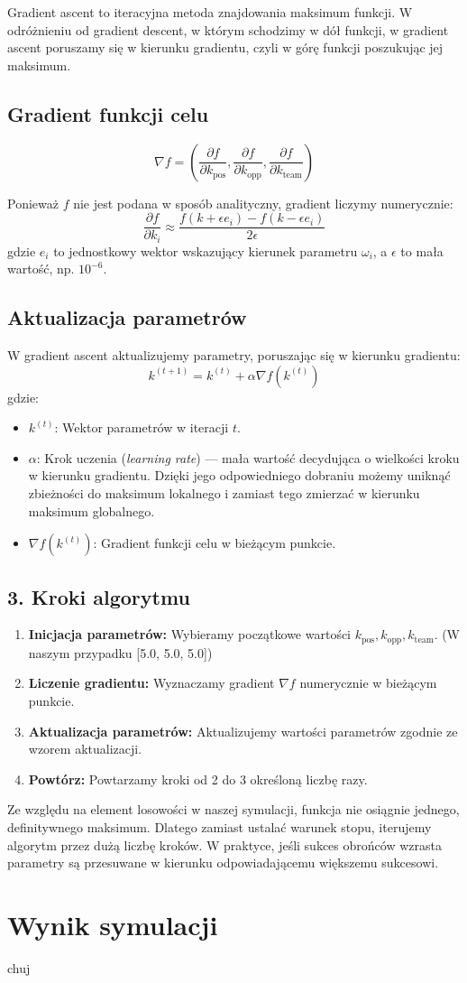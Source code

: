 \documentclass{article}
\begin{document}
Gradient ascent to iteracyjna metoda znajdowania maksimum funkcji. W odróżnieniu od gradient descent, w którym schodzimy w dół funkcji, w gradient ascent poruszamy się w kierunku gradientu, czyli w górę funkcji poszukując jej maksimum.

\subsection*{Gradient funkcji celu}

\[
\nabla f = \left( \frac{\partial f}{\partial k_{\text{pos}}}, \frac{\partial f}{\partial k_{\text{opp}}}, \frac{\partial f}{\partial k_{\text{team}}} \right)
\]

Ponieważ \(f\) nie jest podana w sposób analityczny, gradient liczymy numerycznie:
\[
\frac{\partial f}{\partial k_i} \approx \frac{f(k + \epsilon e_i) - f(k - \epsilon e_i)}{2\epsilon}
\]
gdzie \(e_i\) to jednostkowy wektor wskazujący kierunek parametru \(\omega_i\), a \(\epsilon\) to mała wartość, np. \(10^{-6}\).

\subsection*{Aktualizacja parametrów}
W gradient ascent aktualizujemy parametry, poruszając się w kierunku gradientu:
\[
k^{(t+1)} = k^{(t)} + \alpha \nabla f(k^{(t)})
\]
gdzie:
\begin{itemize}
    \item \(k^{(t)}\): Wektor parametrów w iteracji \(t\).
    \item \(\alpha\): Krok uczenia (\textit{learning rate}) — mała wartość decydująca o wielkości kroku w kierunku gradientu. Dzięki jego odpowiedniego dobraniu możemy uniknąć zbieżności do maksimum lokalnego i zamiast tego zmierzać w kierunku maksimum globalnego.
    \item \(\nabla f(k^{(t)})\): Gradient funkcji celu w bieżącym punkcie.
\end{itemize}

\subsection*{3. Kroki algorytmu}
\begin{enumerate}
    \item \textbf{Inicjacja parametrów:} Wybieramy początkowe wartości \(k_{\text{pos}}, k_{\text{opp}}, k_{\text{team}}\). (W naszym przypadku [5.0, 5.0, 5.0])
    \item \textbf{Liczenie gradientu:} Wyznaczamy gradient \(\nabla f\) numerycznie w bieżącym punkcie.
    \item \textbf{Aktualizacja parametrów:} Aktualizujemy wartości parametrów zgodnie ze wzorem aktualizacji.
    \item \textbf{Powtórz:} Powtarzamy kroki od 2 do 3 określoną liczbę razy.
\end{enumerate}
Ze względu na element losowości w naszej symulacji, funkcja nie osiągnie jednego, definitywnego maksimum. Dlatego zamiast ustalać warunek stopu, iterujemy algorytm przez dużą liczbę kroków. W praktyce, jeśli sukces obrońców wzrasta parametry są przesuwane w kierunku odpowiadającemu większemu sukcesowi.


\section*{Wynik symulacji}
chuj
\end{document}
